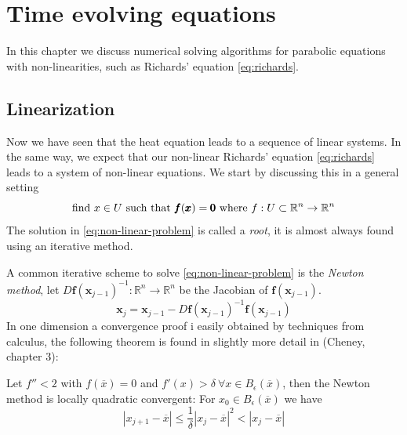 \documentclass[../Main/main.tex]{subfiles}
\begin{document}
	\graphicspath{{../Time dependent equations/figs/}}
	\chapter{Time evolving equations}
	In this chapter we discuss numerical solving algorithms for parabolic equations with non-linearities, such as Richards' equation \eqref{eq:richards}. 

	
	\section*{Linearization}
	Now we have seen that the heat equation leads to a sequence of linear systems. In the same way, we expect that our non-linear Richards' equation \eqref{eq:richards} leads to a system of non-linear equations. We start by discussing this in a general setting
	\begin{equation}\label{eq:non-linear-problem}
		\text{find }x\in U \text{ such that }\pmb{f}(\pmb{x})=\pmb{0} \\ \text{ where } f:U\subset\mathbb{R}^n\rightarrow\mathbb{R}^n
	\end{equation}
	The solution in \eqref{eq:non-linear-problem} is called a \emph{root}, it is almost always found using an iterative method.\par 
	A common iterative scheme to solve \eqref{eq:non-linear-problem} is the \emph{Newton method}, let $D\pmb{f}(\pmb{x}_{j-1})^{-1}:\mathbb{R}^n\rightarrow\mathbb{R}^n$ be the Jacobian of $\pmb{f}(\pmb{x}_{j-1})$.
	\begin{equation}
		\pmb{x}_j = \pmb{x}_{j-1} -D\pmb{f}(\pmb{x}_{j-1})^{-1}\pmb{f}(\pmb{x}_{j-1})
	\end{equation}
	In one dimension a convergence proof i easily obtained by techniques from calculus, the following theorem is found in  slightly more detail in (Cheney\cite{Cheney}, chapter 3):
	\begin{theorem}
		Let $f''<2$ with $f(\overline{x})=0$ and $f'(x)> \delta \ \forall x \in B_{\epsilon}(\overline{x})$, then the Newton method is locally quadratic convergent:  For $x_0\in B_{\epsilon}(\overline{x})$ we have
		\begin{equation}
			| x_{j+1}-\overline{x}| \leq \frac{1}{\delta}|x_j - \overline{x}|^2< |x_j-\overline{x}|
		\end{equation}
	\end{theorem}
\end{document}
